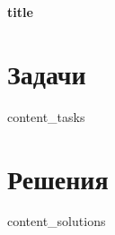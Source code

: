 \documentclass[12pt]{article}
\begin{document}
\begin{center}
{\LARGE\bfseries {{ title }}}
\end{center}

\section*{Задачи}
\begin{enumerate}
{{ content_tasks }}
\end{enumerate}

\section*{Решения}
\begin{enumerate}
{{ content_solutions }}
\end{enumerate}
\end{document}
